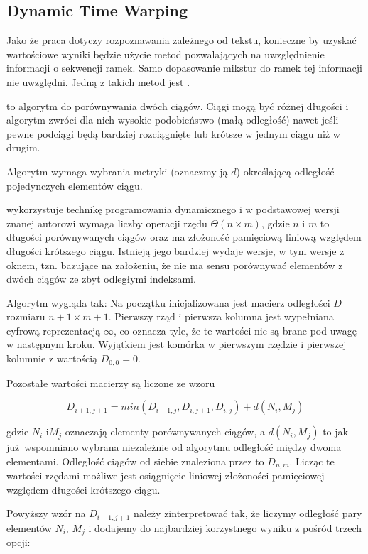 \subsection{Dynamic Time Warping}\label{sec:dtw}

Jako że praca dotyczy rozpoznawania zależnego od tekstu, konieczne by uzyskać wartościowe wyniki będzie
użycie metod pozwalających na uwzględnienie informacji o sekwencji ramek. Samo dopasowanie mikstur do ramek
tej informacji nie uwzględni. Jedną z takich metod jest .

 to algorytm do porównywania dwóch ciągów. Ciągi mogą być różnej długości i algorytm zwróci
dla nich wysokie podobieństwo (małą odległość) nawet jeśli pewne podciągi będą bardziej rozciągnięte lub krótsze
w jednym ciągu niż w drugim.

Algorytm wymaga wybrania metryki (oznaczmy ją $d$) określającą odległość pojedynczych elementów ciągu.

 wykorzystuje technikę programowania dynamicznego i w podstawowej wersji znanej autorowi wymaga liczby operacji
rzędu $\Theta(n \times m)$, gdzie $n$ i $m$ to długości porównywanych ciągów oraz ma złożoność pamięciową liniową
względem długości krótszego ciągu. Istnieją jego bardziej wydaje wersje, w tym wersje z oknem, tzn. bazujące na
założeniu, że nie ma sensu porównywać elementów z dwóch ciągów ze zbyt odległymi indeksami.

Algorytm wygląda tak: Na początku inicjalizowana jest macierz odległości $D$ rozmiaru $n + 1 \times m + 1$. Pierwszy
rząd i pierwsza kolumna jest wypełniana cyfrową reprezentacją $\infty$, co oznacza tyle,
że te wartości nie są brane pod uwagę w następnym kroku.
Wyjątkiem jest komórka w pierwszym rzędzie i pierwszej kolumnie z wartością $D_{0,0} = 0$.

Pozostałe wartości macierzy są liczone ze wzoru

$$D_{i+1, j+1} = min(D_{i+1, j}, D_{i, j+1}, D_{i, j}) + d(N_i, M_j)$$

gdzie $N_i$ i$M_j$ oznaczają elementy porównywanych ciągów, a $d(N_i, M_j)$ to jak już wspomniano wybrana
niezależnie od algorytmu odległość między dwoma elementami. Odległość ciągów od siebie znaleziona przez 
to $D_{n, m}$.  Licząc te wartości rzędami możliwe jest osiągnięcie liniowej złożoności pamięciowej względem
długości krótszego ciągu.

Powyższy wzór na $D_{i+1, j+1}$ należy zinterpretować tak, że liczymy odległość pary elementów $N_i$, $M_j$ i dodajemy
do najbardziej korzystnego wyniku z pośród trzech opcji:

